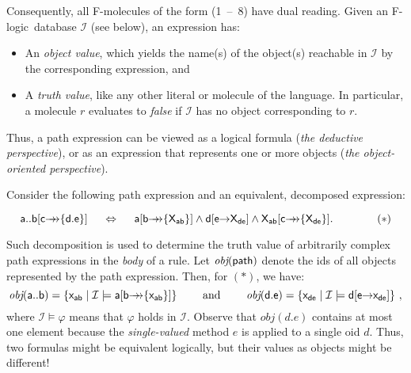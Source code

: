 \documentclass[11pt]{article}
\newcommand{\obj}{\textit{obj}\xspace}
\newcommand{\db}[1]{\ensuremath{\mathcal{#1}}}
\newcommand{\fd}{\ensuremath{{\rightarrow}}}                   %
\newcommand{\mvd}{\ensuremath{{\rightarrow\!\!\!\!\rightarrow}}}  %
\newcommand{\fl}{\mbox{F-logic}\xspace}
\begin{document}
Consequently, all F-molecules of the form (1~--~8) 
have dual reading. Given an
\fl\ database \db I (see below), an expression has:
\begin{itemize}
\item An \emph{object value}, which yields the name(s) of the object(s)
  reachable in \db I by the corresponding expression, and 
\item A \emph{truth value}, like any other literal or molecule of the
  language. In particular, a molecule $r$ evaluates to \emph{false} if
  \db I has no object corresponding to $r$.
\end{itemize}
Thus, a path expression can be viewed as a logical formula (\emph{the
  deductive perspective}), or as an expression that represents one or more
objects (\emph{the object-oriented perspective}).

Consider the following path expression and an equivalent, decomposed
expression:

\begin{displaymath}
\sf
a..b[c\mvd\{d.e\}] \quad\ \Leftrightarrow \quad\  a[b\mvd\{X_{ab}\}]
\land d[e\fd X_{de}] \land X_{ab}[c\mvd\{X_{de}\}]. \hspace{4em} (*)
\end{displaymath}

\noindent
Such decomposition is used to determine the truth value of arbitrarily complex
path expressions in the \emph{body} of a rule.  Let $\sf \obj(path)$ denote
the ids of all objects represented by the path expression. Then, for $(*)$,
we have:
\begin{displaymath} \sf
\obj(a..b) = \{x_{ab} \mid \db I \models a[b\mvd\{x_{ab}\}]\}
\qquad\textrm{ and }\qquad \obj(d.e) = \{x_{de} \mid \db I \models d[e\fd 
x_{de}]\} ~,
\end{displaymath}
%
where $\db I \models \varphi$ means that $\varphi$ holds in \db I.
Observe that $\obj(d.e)$ contains at most one element because the
\emph{single-valued} method $e$ is applied to a single oid $d$. Thus, two
formulas might be equivalent logically, but their values as objects might
be different!
\end{document}
